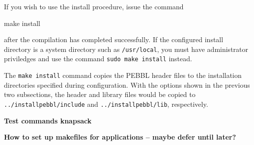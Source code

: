 If you wish to use the install procedure, issue the command 
\begin{codeblock}
make install
\end{codeblock}
after the compilation has completed successfully.  If the configured install
directory is a system directory such as \texttt{/usr/local}, you must have
administrator priviledges and use the command \texttt{sudo make install}
instead.

The \texttt{make install} command copies the PEBBL header files to the
installation directories specified during configuration.  With the options
shown in the previous two subsections, the header and library files would be
copied to \texttt{../installpebbl/include} and \texttt{../installpebbl/lib},
respectively.

\textbf{Test commands knapsack}

\textbf{How to set up makefiles for applications -- maybe defer until later?}
